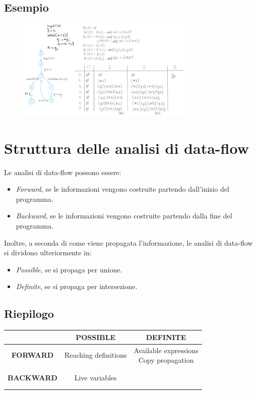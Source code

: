 \documentclass[a4paper,oneside,titlepage]{book}
\begin{document}
\subsection{Esempio}
\label{rd5}
\begin{figure}[htp]
	\centering
	\includegraphics[width=0.75\textwidth]{rd4.png}
\end{figure}


\section{Struttura delle analisi di data-flow} %
Le analisi di data-flow possono essere:
\begin{itemize}
    \item \textit{Forward}, se le informazioni vengono costruite partendo dall'inizio del programma.
    \item \textit{Backward}, se le informazioni vengono costruite partendo dalla fine del programma.
\end{itemize}
Inoltre, a seconda di come viene propagata l'informazione, le analisi di data-flow si dividono ulteriormente in:
\begin{itemize}
    \item \textit{Possible}, se si propaga per unione.
    \item \textit{Definite}, se si propaga per intersezione.
\end{itemize}

\subsection{Riepilogo}
\begin{center}
\begin{tabular}{c|c|c}
	 & \textbf{POSSIBLE} & \textbf{DEFINITE} \\
	\hline
	\textbf{FORWARD} & Reaching definitions & \makecell{Available expressions \\ Copy propagation} \\
	\hline
    \textbf{BACKWARD} & Live variables & \makecell{~ \\ ~} \\
\end{tabular}
\end{center}
\end{document}
